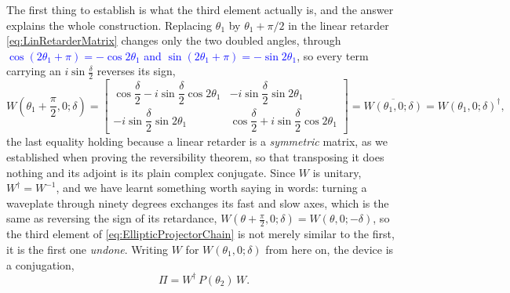             The first thing to establish is what the third element actually is, and the answer explains the whole construction. Replacing $\theta_1$ by $\theta_1+\pi/2$ in the linear retarder \ref{eq:LinRetarderMatrix} changes only the two doubled angles, through \textcolor{blue}{$\cos\left(2\theta_1+\pi\right)=-\cos2\theta_1$ and $\sin\left(2\theta_1+\pi\right)=-\sin2\theta_1$}, so every term carrying an $i\sin\frac{\delta}{2}$ reverses its sign,
            \begin{equation}\label{eq:PlateInverse}
                W\left(\theta_1+\frac{\pi}{2},0;\delta\right) = \begin{bmatrix}
                    \cos\dfrac{\delta}{2}-i\sin\dfrac{\delta}{2}\cos2\theta_1 & -i\sin\dfrac{\delta}{2}\sin2\theta_1 \\[8pt]
                    -i\sin\dfrac{\delta}{2}\sin2\theta_1 & \cos\dfrac{\delta}{2}+i\sin\dfrac{\delta}{2}\cos2\theta_1
                \end{bmatrix} = \overline{W\left(\theta_1,0;\delta\right)} = W\left(\theta_1,0;\delta\right)^{\dagger},
            \end{equation}
            the last equality holding because a linear retarder is a \emph{symmetric} matrix, as we established when proving the reversibility theorem, so that transposing it does nothing and its adjoint is its plain complex conjugate. Since $W$ is unitary, $W^{\dagger}=W^{-1}$, and we have learnt something worth saying in words: turning a waveplate through ninety degrees exchanges its fast and slow axes, which is the same as reversing the sign of its retardance, $W(\theta+\frac\pi2,0;\delta)=W(\theta,0;-\delta)$, so the third element of \ref{eq:EllipticProjectorChain} is not merely similar to the first, it is the first one \textit{undone}. Writing $W$ for $W(\theta_1,0;\delta)$ from here on, the device is a conjugation,
            \begin{equation}\label{eq:EllipticProjectorSandwich}
                \Pi = W^{\dagger}\,P\left(\theta_2\right)\,W .
            \end{equation}


